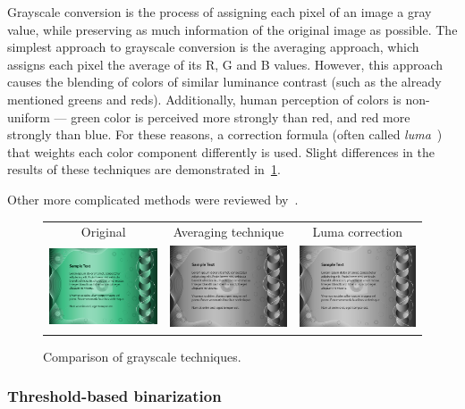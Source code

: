 Grayscale conversion is the process of assigning each pixel of an image a gray value, while preserving as much information of the original image as possible. The simplest approach to grayscale conversion is the averaging approach, which assigns each pixel the average of its R, G and B values. However, this approach causes the blending of colors of similar luminance contrast (such as the already mentioned greens and reds). Additionally, human perception of colors is non-uniform --- green color is perceived more strongly than red, and red more strongly than blue. For these reasons, a correction formula (often called \emph{luma}~\cite{grayscaleConv}) that weights each color component differently is used. Slight differences in the results of these techniques are demonstrated in~\cref{fig:preprocessGrayscale}.

Other more complicated methods were reviewed by~\citet{grayscaleCadik}.

\begin{figure}[t]
\centering
{\sffamily
\begin{tabular}{ccc}
Original & Averaging technique & Luma correction \\
\includegraphics[width=.28\linewidth]{img/preprocessing/grayscale_orig.jpg}
&
\includegraphics[width=.28\linewidth]{img/preprocessing/grayscale_avg.png}
&
\includegraphics[width=.28\linewidth]{img/preprocessing/grayscale_luma.png}
\end{tabular}
}
\caption{Comparison of grayscale techniques.}
\label{fig:preprocessGrayscale}
\end{figure}

\subsubsection{Threshold-based binarization}

